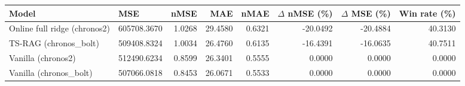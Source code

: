 \begin{tabular}{llrrrrrr}
\toprule
Model & MSE & nMSE & MAE & nMAE & $\Delta$ nMSE (\%) & $\Delta$ MSE (\%) & Win rate (\%) \\
\midrule
Online full ridge (chronos2) & 605708.3670 & 1.0268 & 29.4580 & 0.6321 & -20.0492 & -20.4884 & 40.3130 \\
TS-RAG (chronos\_bolt) & 509408.8324 & 1.0034 & 26.4760 & 0.6135 & -16.4391 & -16.0635 & 40.7511 \\
Vanilla (chronos2) & 512490.6234 & 0.8599 & 26.3401 & 0.5555 & 0.0000 & 0.0000 & 0.0000 \\
Vanilla (chronos\_bolt) & 507066.0818 & 0.8453 & 26.0671 & 0.5533 & 0.0000 & 0.0000 & 0.0000 \\
\bottomrule
\end{tabular}

